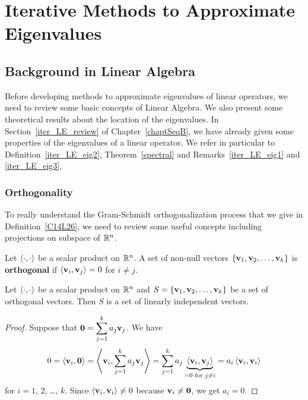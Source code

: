 \chapter{Iterative Methods to Approximate Eigenvalues}
\label{chapEigVal}

\section{Background in Linear Algebra}

Before developing methods to approximate eigenvalues of linear operators, we
need to review some basic concepts of Linear Algebra.  We also present some
theoretical results about the location of the eigenvalues.  In
Section~\ref{iter_LE_review} of Chapter~\ref{chaptSeqB}, we have already
given some properties of the eigenvalues of a linear operator.  We refer in
particular to Definition~\ref{iter_LE_eig2}, Theorem~\ref{spectral}
and Remarks~\ref{iter_LE_eig1} and \ref{iter_LE_eig3},

\subsection{Orthogonality}

To really understand the Gram-Schmidt orthogonalization process that
we give in Definition~\ref{C14L26}, we need to review some useful
concepts including projections on subspace of $\mathbb{R}^n$.

\begin{defn}
Let $\left\langle{\cdot} , {\cdot}\right\rangle$ be a scalar product on $\mathbb{R}^n$.  A set of
non-null vectors $\{\mathbf{v}_1, \mathbf{v}_2, \ldots , \mathbf{v}_k\}$ is
{\bfseries orthogonal} if
$\left\langle{\mathbf{v}_i} , {\mathbf{v}_j}\right\rangle = 0$ for $i\neq j$.
\end{defn}

\begin{prop}
Let $\left\langle{\cdot} , {\cdot}\right\rangle$ be a scalar product on $\mathbb{R}^n$ and
$S = \{\mathbf{v}_1, \mathbf{v}_2, \ldots , \mathbf{v}_k\}$ be a set of
orthogonal vectors.  Then $S$ is a set of linearly independent
vectors.
\end{prop}

\begin{proof}
Suppose that $\displaystyle \mathbf{0} = \sum_{j=1}^k a_j \mathbf{v}_j$.
We have
\[
0 = \left\langle{\mathbf{v}_i} , {\mathbf{0}}\right\rangle
= \left\langle{\mathbf{v}_i} , {\sum_{j=1}^k a_j \mathbf{v}_j}\right\rangle
= \sum_{j=1}^k a_j
\underbrace{\left\langle{\mathbf{v}_i} , {\mathbf{v}_j}\right\rangle}_{=0\text{ for } j\neq i}
= a_i \left\langle{\mathbf{v}_i} , {\mathbf{v}_i}\right\rangle
\]
for $i=1$, $2$, \ldots, $k$.  Since $\left\langle{\mathbf{v}_i} , {\mathbf{v}_i}\right\rangle \neq 0$
because $\mathbf{v}_i \neq \mathbf{0}$, we get $a_i=0$.
\end{proof}

